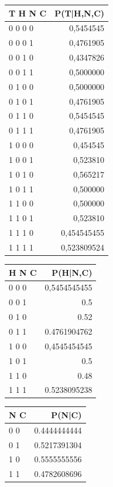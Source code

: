 \documentclass[a4paper]{article}
\begin{document}
\begin{table}[]
\centering
\begin{tabular}{l|r}
T	H	N	C & P(T|H,N,C) \\\hline

0	0	0	0	& 0,5454545\\
0	0	0	1	& 0,4761905\\
0	0	1	0	& 0,4347826\\
0	0	1	1	& 0,5000000\\
0	1	0	0	& 0,5000000\\
0	1	0	1	& 0,4761905\\
0	1	1	0	& 0,5454545\\
0	1	1	1	& 0,4761905\\
1	0	0	0	& 0,454545\\
1	0	0	1	& 0,523810\\
1	0	1	0	& 0,565217\\
1	0	1	1	& 0,500000\\
1	1	0	0	& 0,500000\\
1	1	0	1	& 0,523810\\
1	1	1	0	& 0,454545455\\
1	1	1	1	& 0,523809524

\end{tabular}
\end{table}

\begin{table}[]
\centering
\begin{tabular}{l|r}
H	N	C & P(H|N,C) \\\hline

0	0	0	& 0,5454545455\\
0	0	1	& 0.5\\
0	1	0	& 0.52\\
0	1	1	& 0.4761904762\\
1	0	0	& 0,4545454545\\
1	0	1	& 0.5\\
1	1	0	& 0.48\\
1	1	1	& 0.5238095238\\

\end{tabular}
\end{table}

\begin{table}[]
\centering
\begin{tabular}{l|r}
N	C & P(N|C) \\\hline

0	0	& 0.4444444444\\
0	1	& 0.5217391304\\
1	0	& 0.5555555556\\
1	1	& 0.4782608696\\

\end{tabular}
\end{table}
\end{document}
